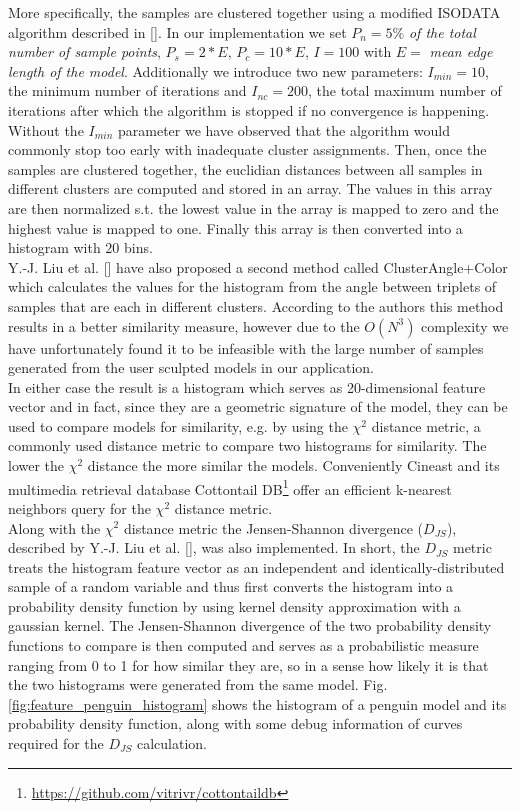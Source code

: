 More specifically, the samples are clustered together using a modified
ISODATA algorithm described in []. In our implementation we set $P_n = 5\%$ \textit{of the total number of sample points}, $P_s = 2 * E$, $P_c = 10 * E$, $I = 100$ with $E =$ \textit{mean edge length of the model}.
Additionally we introduce two new parameters: $I_{min} = 10$, the minimum number of iterations and $I_{nc} = 200$, the total maximum number of iterations after which the algorithm is stopped if no convergence is happening. Without
the $I_{min}$ parameter we have observed that the algorithm would commonly stop too early with inadequate cluster assignments. Then, once the samples are clustered together, the euclidian distances between all samples in different clusters
are computed and stored in an array. The values in this array are then normalized s.t. the lowest value in the array is mapped to zero and the highest value is mapped to one. Finally this array is then converted into a histogram with $20$
bins.\\
Y.-J. Liu et al. [] have also proposed a second method called ClusterAngle+Color which calculates the values for the histogram from the angle between triplets of samples that are each in different clusters. According
to the authors this method results in a better similarity measure, however due to the $O(N^3)$ complexity we have unfortunately found it to be infeasible with the large number of samples generated from the user sculpted models in our application.\\
In either case the result is a histogram which serves as 20-dimensional feature vector and in fact, since they are a geometric signature of the model, they can be used to compare models for similarity,
e.g. by using the $\chi^2$ distance metric, a commonly used distance metric to compare two histograms for similarity. The lower the $\chi^2$ distance the more similar the models. Conveniently Cineast and its multimedia retrieval
database Cottontail DB\footnote{\url{https://github.com/vitrivr/cottontaildb}} offer an efficient k-nearest neighbors query for the $\chi^2$ distance metric.\\
Along with the $\chi^2$ distance metric the Jensen-Shannon divergence ($D_{JS}$), described by Y.-J. Liu et al. [], was also implemented. In short, the $D_{JS}$ metric treats the histogram feature vector as an independent and identically-distributed sample of a random variable and thus first converts the histogram into a probability density function by using kernel density approximation with a gaussian kernel. The Jensen-Shannon divergence of the two probability density functions to compare is then computed and serves as a probabilistic measure ranging from 0 to 1 for how similar they are, so in a sense how likely it is that the two histograms were generated from the same model. Fig. \ref{fig:feature_penguin_histogram} shows the histogram of a penguin model and its probability density function, along with some debug information of curves required for the $D_{JS}$ calculation.


